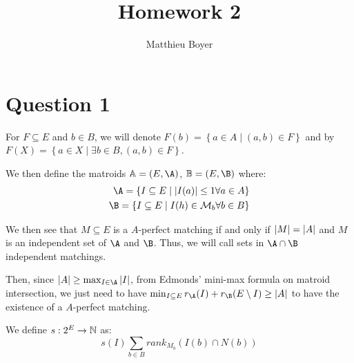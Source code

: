 \documentclass[math, info]{cours}
\author{Matthieu Boyer}
\title{Homework 2}
\begin{document}
\maketitle
\section{Question 1}
\begin{notationT}
	For $F \subseteq E$ and $b \in B$, we will denote $F(b) = \left\{ a \in A \mid (a, b) \in F \right\}$ and by $F(X) = \left\{ a\in X \mid \exists b\in B, (a, b) \in F \right\}$.
\end{notationT}

We then define the matroids $\mathbb{A} = (E, \A)$, $\mathbb{B} = (E, \B)$ where:
\begin{align*}
	\A = \left\{ I \subseteq E \mid \abs{I(a)} \leq 1 \forall a \in A\right\}\\
	\B = \left\{ I \subseteq E \mid I(h) \in \mathcal{M}_{b} \forall b \in B\right\}
\end{align*}

We then see that $M \subseteq E$ is a $A$-perfect matching if and only if $\left|M\right| = \left|A\right|$ and
$M$ is an independent set of $\A$ and $\B$.
Thus, we will call sets in $\A \cap \B$ independent matchings.

Then, since $\abs{A} \geq \max_{I \in \A}{\abs{I}}$, from Edmonds' mini-max formula on matroid intersection, we just need to have $\min_{I\subseteq E} r_{\A}(I) + r_{\B}(E\setminus I) \geq \abs{A}$ to have the existence of a $A$-perfect matching.

We define $s: 2^{E} \to \mathbb{N}$ as:
\begin{equation}
	s(I) \sum_{b \in B} rank_{M_{b}}(I(b) \cap N(b))
\end{equation}
\end{document}
